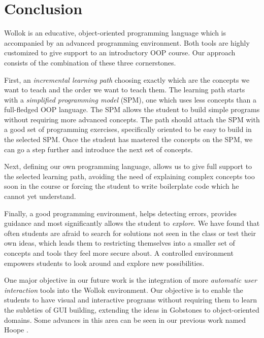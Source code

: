 \section{Conclusion}
\label{sec:conclusion}



Wollok is an educative, object-oriented programming language which is accompanied by an advanced programming environment.
Both tools are highly customized to give support to an introductory OOP course.
Our approach consists of the combination of these three cornerstones.

First, an \emph{incremental learning path} choosing exactly which are the concepts we want to teach and the order we want to teach them.
The learning path starts with a \emph{simplified programming model} (SPM), \ie one which uses less concepts than a full-fledged OOP language.
The SPM allows the student to build simple programs without requiring more advanced concepts.
The path should attach the SPM with a good set of programming exercises, specifically oriented to be easy to build in the selected SPM.
Once the student has mastered the concepts on the SPM, we can go a step further and introduce the next set of concepts.

Next, defining our own programming language, allows us to give full support to the selected learning path, 
avoiding the need of explaining complex concepts too soon in the course or forcing the student to write boilerplate code which he cannot yet understand.

Finally, a good programming environment, helps detecting errors, provides guidance and most significantly allows the student to \emph{explore}.
We have found that often students are afraid to search for solutions not seen in the class or test their own ideas, 
which leads them to restricting themselves into a smaller set of concepts and tools they feel more secure about.
A controlled environment empowers students to look around and explore new possibilities.

\medskip

\label{sec:furtherWork}
One major objective in our future work is the integration of more \emph{automatic user interaction} tools into the Wollok environment.
Our objective is to enable the students to have visual and interactive programs without requiring them to learn the subleties of GUI building, 
extending the ideas in Gobstones \cite{lopez_nombre_2012} to object-oriented domains.
Some advances in this area can be seen in our previous work named Hoope \cite{estefania_miguel_hoope_2013}.

